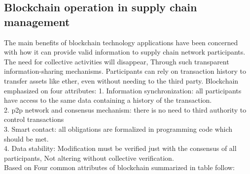 \subsection{Blockchain operation in supply chain management}
The main benefits of blockchain technology applications have been concerned with how it can
provide valid information to supply chain network participants.  The need for collective activities will disappear, Through such transparent information-sharing mechanisms.
Participants can rely on transaction history to transfer assets like ether, even without needing to the third party\cite{Nina}.
Blockchain emphasized on four attributes:
1. Information synchronization: all participants have access to the same data containing a history of the transaction.\\
2. p2p network and consensus mechanism: there is no need to third authority to control transactions\\
3. Smart contact: all obligations are formalized in programming code which should be met.\\
4. Data stability: Modification must be verified just with the consensus of all participants, Not altering without collective verification\cite{Nina}. \\
Based on Four common attributes of blockchain
summarized in table follow:\\
